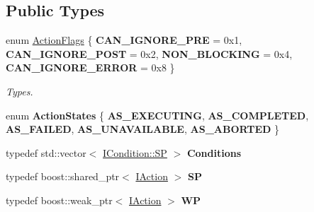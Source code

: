 \subsection*{Public Types}
\begin{DoxyCompactItemize}
\item 
\mbox{\label{class_i_action_aeeeed1494a57b36c5c3694d6daa845ee}} 
enum \hyperlink{class_i_action_aeeeed1494a57b36c5c3694d6daa845ee}{Action\+Flags} \{ {\bfseries C\+A\+N\+\_\+\+I\+G\+N\+O\+R\+E\+\_\+\+P\+RE} = 0x1, 
{\bfseries C\+A\+N\+\_\+\+I\+G\+N\+O\+R\+E\+\_\+\+P\+O\+ST} = 0x2, 
{\bfseries N\+O\+N\+\_\+\+B\+L\+O\+C\+K\+I\+NG} = 0x4, 
{\bfseries C\+A\+N\+\_\+\+I\+G\+N\+O\+R\+E\+\_\+\+E\+R\+R\+OR} = 0x8
 \}\begin{DoxyCompactList}\small\item\em Types. \end{DoxyCompactList}
\item 
\mbox{\label{class_i_action_ab3214c20841529adea22b1a8176eaa0d}} 
enum {\bfseries Action\+States} \{ \newline
{\bfseries A\+S\+\_\+\+E\+X\+E\+C\+U\+T\+I\+NG}, 
{\bfseries A\+S\+\_\+\+C\+O\+M\+P\+L\+E\+T\+ED}, 
{\bfseries A\+S\+\_\+\+F\+A\+I\+L\+ED}, 
{\bfseries A\+S\+\_\+\+U\+N\+A\+V\+A\+I\+L\+A\+B\+LE}, 
\newline
{\bfseries A\+S\+\_\+\+A\+B\+O\+R\+T\+ED}
 \}
\item 
\mbox{\label{class_i_action_a727fdbdee90d75af36f6445526071aee}} 
typedef std\+::vector$<$ \hyperlink{class_i_condition_a9e52c5b905c336e61daf97bc3f10def8}{I\+Condition\+::\+SP} $>$ {\bfseries Conditions}
\item 
\mbox{\label{class_i_action_aee03a4f0b336457bacf052ae337517c4}} 
typedef boost\+::shared\+\_\+ptr$<$ \hyperlink{class_i_action}{I\+Action} $>$ {\bfseries SP}
\item 
\mbox{\label{class_i_action_a296c74714a4a8bb95f7873248990563c}} 
typedef boost\+::weak\+\_\+ptr$<$ \hyperlink{class_i_action}{I\+Action} $>$ {\bfseries WP}
\end{DoxyCompactItemize}

